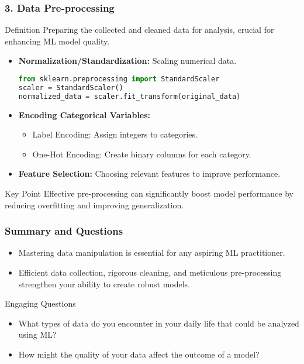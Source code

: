 \documentclass[aspectratio=169]{beamer}
\begin{document}
\begin{frame}[fragile]
    \frametitle{3. Data Pre-processing}

    \begin{block}{Definition}
        Preparing the collected and cleaned data for analysis, crucial for enhancing ML model quality.
    \end{block}
    
    \begin{itemize}
        \item \textbf{Normalization/Standardization:} Scaling numerical data.
            \begin{lstlisting}[language=Python]
from sklearn.preprocessing import StandardScaler
scaler = StandardScaler()
normalized_data = scaler.fit_transform(original_data)
            \end{lstlisting}
        \item \textbf{Encoding Categorical Variables:}
            \begin{itemize}
                \item Label Encoding: Assign integers to categories.
                \item One-Hot Encoding: Create binary columns for each category.
            \end{itemize}
        \item \textbf{Feature Selection:} Choosing relevant features to improve performance.
    \end{itemize}

    \begin{block}{Key Point}
        Effective pre-processing can significantly boost model performance by reducing overfitting and improving generalization.
    \end{block}
\end{frame}

\begin{frame}[fragile]
    \frametitle{Summary and Questions}

    \begin{itemize}
        \item Mastering data manipulation is essential for any aspiring ML practitioner.
        \item Efficient data collection, rigorous cleaning, and meticulous pre-processing strengthen your ability to create robust models.
    \end{itemize}

    \begin{block}{Engaging Questions}
        \begin{itemize}
            \item What types of data do you encounter in your daily life that could be analyzed using ML?
            \item How might the quality of your data affect the outcome of a model?
        \end{itemize}
    \end{block}
\end{frame}
\end{document}
